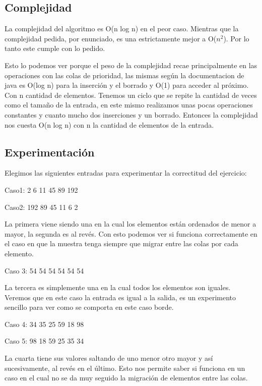 \subsection{Complejidad}
La complejidad del algoritmo es O(n log n) en el peor caso. 
Mientras que la complejidad pedida, por enunciado, es una estrictamente mejor a O($n^2$). Por lo tanto este cumple con lo pedido. 

Esto lo podemos ver porque el peso de la complejidad recae principalmente en las operaciones con las colas de prioridad, las mismas según la documentacion de java es 
O(log n) para la inserción y el borrado y O(1) para acceder al próximo. Con n cantidad de elementos. Tenemos un ciclo que se repite la cantidad de veces como el tamaño de 
la entrada, en este mismo realizamos unas pocas operaciones constantes y cuanto mucho dos inserciones y un borrado. Entonces la complejidad nos cuesta O(n log n) con n
la cantidad de elementos de la entrada.

\subsection{Experimentación}

Elegimos las siguientes entradas para experimentar la correctitud del ejercicio:

Caso1: 2 6 11 45 89 192

Caso2: 192 89 45 11 6 2

La primera viene siendo una en la cual los elementos están ordenados de menor a mayor, la segunda es al revés. Con esto podemos ver si funciona correctamente en el caso en que
la muestra tenga siempre que migrar entre las colas por cada elemento. 

Caso 3: 54 54 54 54 54 54

La tercera es simplemente una en la cual todos los elementos son iguales. Veremos que en este caso la entrada es igual a la salida, es un experimento sencillo para ver como se
comporta en este caso borde. 

Caso 4: 34 35 25 59 18 98

Caso 5: 98 18 59 25 35 34

\newpage

La cuarta tiene sus valores saltando de uno menor otro mayor y así sucesivamente, al revés en el último. Esto nos permite saber si funciona en un caso en el cual no se da muy
seguido la migración de elementos entre las colas.

